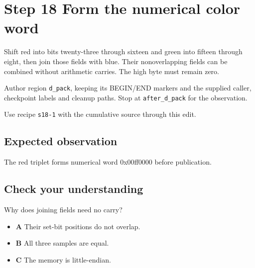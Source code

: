 \section{Step 18 Form the numerical color word}\label{ppm-s18}

Shift red into bits twenty-three through sixteen and green into fifteen through eight, then join those fields with blue. Their nonoverlapping fields can be combined without arithmetic carries. The high byte must remain zero.

Author region \texttt{d\_pack}, keeping its BEGIN/END markers and the supplied caller, checkpoint labels and cleanup paths. Stop at \texttt{after\_d\_pack} for the observation.

Use recipe \texttt{s18-1} with the cumulative source through this edit.

\subsection{Expected observation}
The red triplet forms numerical word 0x00ff0000 before publication.

\subsection{Check your understanding}
Why does joining fields need no carry?

\begin{itemize}
  \item \textbf{A} Their set-bit positions do not overlap.
  \item \textbf{B} All three samples are equal.
  \item \textbf{C} The memory is little-endian.
\end{itemize}

